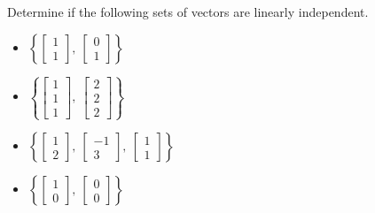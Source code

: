 \documentclass{ximera}
\begin{document}
\begin{exercise}
    Determine if the following sets of vectors are linearly independent.
    \begin{itemize}
        \item $\left\{ \begin{bmatrix} 1 \\ 1 \end{bmatrix},\ \begin{bmatrix} 0 \\ 1 \end{bmatrix}\right\}$
        \begin{multipleChoice}
        \end{multipleChoice}
        \item $\left\{ \begin{bmatrix} 1 \\ 1 \\ 1 \end{bmatrix},\ \begin{bmatrix} 2 \\ 2 \\ 2 \end{bmatrix} \right\}$
        \begin{multipleChoice}
        \end{multipleChoice}
        \item $\left\{ \begin{bmatrix} 1 \\ 2 \end{bmatrix},\ \begin{bmatrix} -1 \\ 3 \end{bmatrix},\ \begin{bmatrix}  1 \\ 1 \end{bmatrix}\right\}$
        \begin{multipleChoice}
        \end{multipleChoice}
        \item $\left\{ \begin{bmatrix}  1 \\ 0 \end{bmatrix},\ \begin{bmatrix} 0 \\ 0 \end{bmatrix}\right\}$
        \begin{multipleChoice}

\end{multipleChoice}
\end{itemize}
\end{exercise}
\end{document}
